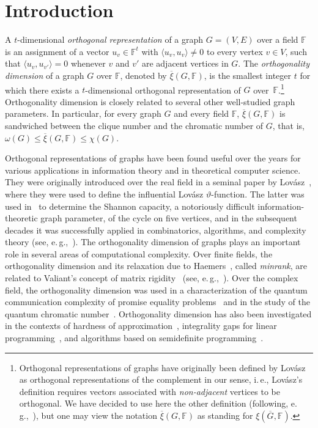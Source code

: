 \documentclass[11pt]{article}
\numberwithin{equation}{section}
\theoremstyle{definition}
\theoremstyle{plain}
\newcommand{\ie}{i.\,e.}
\newcommand{\Fset}{\mathbb{F}}
\newcommand{\od}{\overline{\xi}}
\begin{document}
%
%
%

\section{Introduction}

A $t$-dimensional \emph{orthogonal representation} of a graph $G=(V,E)$ over a field $\Fset$ is an assignment of a vector $u_v \in \Fset^t$ with $\langle u_v,u_v \rangle \neq 0$ to every vertex $v \in V$, such that $\langle u_v, u_{v'} \rangle = 0$ whenever $v$ and $v'$ are adjacent vertices in $G$. The \emph{orthogonality dimension} of a graph $G$ over $\Fset$, denoted by $\od(G, \Fset)$, is the smallest integer $t$ for which there exists a $t$-dimensional orthogonal representation of $G$ over~$\Fset$.\footnote{Orthogonal representations of graphs
%
have originally been defined by Lov\'asz~\cite{Lovasz79}
as orthogonal representations of the complement
in our sense,  %
%
\ie, Lov\'asz's  %
definition requires vectors associated with \emph{non-adjacent} vertices to be orthogonal.
We have decided to use here the other definition (following, e.\,g.,~\cite{deWolfThesis,BrietBLPS15,BrietZ17}), but one may view the notation $\od(G,\Fset)$ as standing for $\xi(\overline{G},\Fset)$.}
%
Orthogonality dimension  %
is closely related to several other well-studied graph parameters. In particular, for every graph $G$ and every field $\Fset$, $\od(G, \Fset)$ is sandwiched between the clique number and the chromatic number of $G$, that is, $\omega(G) \leq \od(G, \Fset) \leq \chi(G)$.

Orthogonal representations of graphs have been found useful over the years for various applications in information theory and in theoretical computer science.
They were originally introduced over the real field in a seminal
%
paper by  %
Lov\'asz~\cite{Lovasz79}, where they were used to define the influential Lov\'asz $\vartheta$-function. The latter was used in~\cite{Lovasz79} to determine the Shannon capacity, a notoriously difficult information-theoretic graph parameter, of the cycle on five vertices, and in the
%
subsequent decades  %
%
%
it was successfully applied in combinatorics, algorithms, and complexity theory (see, e.\,g.,~\cite{Tardos88,knuth1994sandwich,Feige97,AlonK98}).
%
%
%
The orthogonality dimension of graphs plays an important role in several areas of computational complexity.
Over finite fields, the orthogonality dimension and its
%
%
%
relaxation due to Haemers~\cite{Haemers79, Haemers81}, %
%
%
called \emph{minrank},  %
%
%
%
are related to Valiant's concept of matrix rigidity~\cite{Valiant77} (see, e.\,g.,~\cite{CodenottiPR00,Riis07,GolovnevRW17}).
Over the complex field, the orthogonality dimension was used in a characterization of the quantum communication complexity of promise equality problems~\cite{deWolfThesis,BrietBLPS15,BrietZ17} and in the study of the quantum chromatic number~\cite{CameronMNSW07,ScarpaS12}.
%
Orthogonality dimension   %
%
has also been %
investigated in the contexts of hardness of approximation~\cite{Peeters96,LangbergS08}, integrality gaps for linear programming~\cite{HuTS17,Haviv18topo}, and algorithms based on %
semidefinite  %
programming~\cite{ChlamtacH14,HavivMFCS19}.
\end{document}

